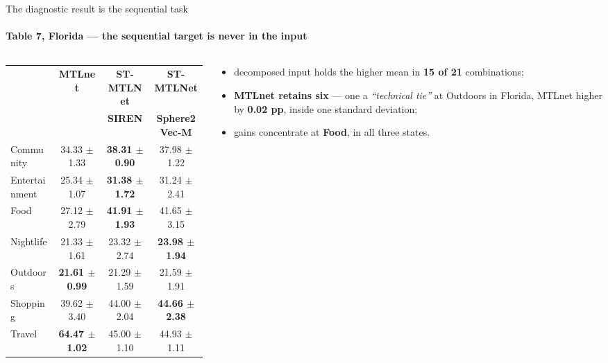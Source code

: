 \documentclass{beamer}
\begin{document}
\begin{frame}{The diagnostic result is the sequential task}
    \framesubtitle{Table 7, Florida --- the sequential target is never in the input}

    \begin{columns}[T,onlytextwidth]
        \begin{column}{0.541\textwidth}
            {\scriptsize
            \setlength{\tabcolsep}{2pt}
            \renewcommand{\arraystretch}{1.1}\begin{tabular}{@{}lccc@{}}
                \toprule
                 & \textbf{MTLnet} & \textbf{ST-MTLNet} & \textbf{ST-MTLNet} \\
                 &                 & \textbf{SIREN}     & \textbf{Sphere2Vec-M} \\
                \midrule
                Community     & 34.33 $\pm$ 1.33          & \textbf{38.31 $\pm$ 0.90} & 37.98 $\pm$ 1.22 \\
                Entertainment & 25.34 $\pm$ 1.07          & \textbf{31.38 $\pm$ 1.72} & 31.24 $\pm$ 2.41 \\
                Food          & 27.12 $\pm$ 2.79          & \textbf{41.91 $\pm$ 1.93} & 41.65 $\pm$ 3.15 \\
                Nightlife     & 21.33 $\pm$ 1.61          & 23.32 $\pm$ 2.74          & \textbf{23.98 $\pm$ 1.94} \\
                Outdoors      & \textbf{21.61 $\pm$ 0.99} & 21.29 $\pm$ 1.59          & 21.59 $\pm$ 1.91 \\
                Shopping      & 39.62 $\pm$ 3.40          & 44.00 $\pm$ 2.04          & \textbf{44.66 $\pm$ 2.38} \\
                Travel        & \textbf{64.47 $\pm$ 1.02} & 45.00 $\pm$ 1.10          & 44.93 $\pm$ 1.11 \\
                \bottomrule
            \end{tabular}\par}
        \end{column}
        \hfill
        \begin{column}{0.389\textwidth}
            \small
            \begin{itemize}\setlength{\itemsep}{5pt}
                \item decomposed input holds the higher mean in \textbf{15 of 21} combinations;
                \item \textbf{MTLnet retains six} --- one a \textit{``technical tie''} at
                      Outdoors in Florida, MTLnet higher by \textbf{0.02 pp}, inside one
                      standard deviation;
                \item gains concentrate at \textbf{Food}, in all three states.
            \end{itemize}
        \end{column}
    \end{columns}


\end{frame}
\end{document}

